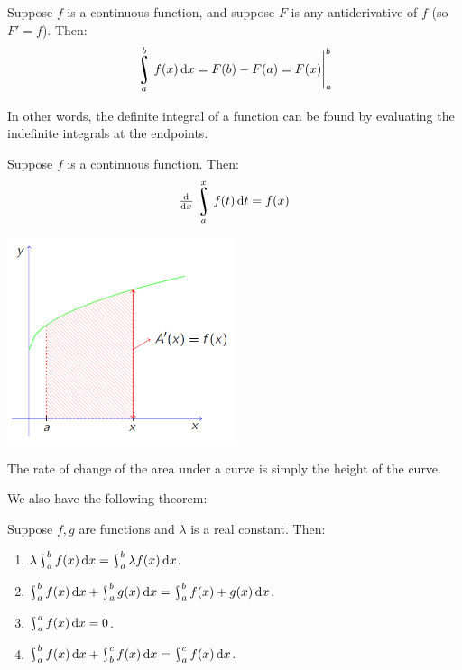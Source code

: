 


\begin{bthm}
  Suppose $ f $ is a continuous function, and suppose $ F $ is any antiderivative of $ f $ (so $ F' = f $). Then:
  \begin{displaymath}
    \rint^b_a f(x) \dif{x} = F(b) - F(a) = \eval{F(x)}_a^b
  \end{displaymath}
\end{bthm}

In other words, the definite integral of a function can be found by evaluating the indefinite integrals at
the endpoints.

\begin{bthm}
  Suppose $ f $ is a continuous function. Then:
  \begin{displaymath}
    \od{}{x} \rint^x_a f(t) \dif{t} = f(x)
  \end{displaymath}
\end{bthm}

\begin{center}
  \includegraphics[width=0.5\textwidth]{ftc1}
\end{center}

The rate of change of the area under a curve is simply the height of the curve.

We also have the following theorem:
\begin{thm}
  Suppose $ f,g $ are functions and $ \lambda $ is a real constant. Then:
  \begin{enumerate}
    \item $ \lambda \rint_a^b f(x) \dif{x} = \rint_a^b \lambda f(x) \dif{x} $.
    \item $ \rint_a^b f(x) \dif{x} + \rint_a^b g(x) \dif{x} = \rint_a^b f(x) + g(x) \dif{x} $.
    \item $ \rint_a^a f(x) \dif{x} = 0 $.
    \item $ \rint_a^b f(x) \dif{x} + \rint_b^c f(x) \dif{x} = \rint_a^c f(x) \dif{x} $.
  \end{enumerate}
\end{thm}

